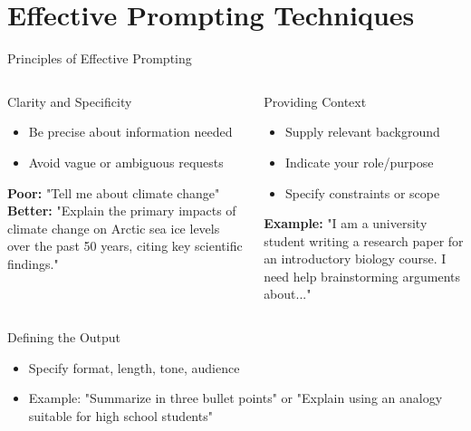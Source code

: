 \documentclass{beamer}
\begin{document}
\section{Effective Prompting Techniques}



\begin{frame}{Principles of Effective Prompting}
\begin{columns}
\begin{block}{Clarity and Specificity}
\begin{itemize}
  \item Be precise about information needed
  \item Avoid vague or ambiguous requests
\end{itemize}
\textbf{Poor:} "Tell me about climate change"
\textbf{Better:} "Explain the primary impacts of climate change on Arctic sea ice levels over the past 50 years, citing key scientific findings."
\end{block}

\pause

\begin{block}{Providing Context}
\begin{itemize}
  \item Supply relevant background
  \item Indicate your role/purpose
  \item Specify constraints or scope
\end{itemize}
\vspace{0.2cm}
\textbf{Example:} "I am a university student writing a research paper for an introductory biology course. I need help brainstorming arguments about..."
\end{block}
\end{columns}

\pause

\begin{block}{Defining the Output}
\begin{itemize}
  \item Specify format, length, tone, audience
  \item Example: "Summarize in three bullet points" or "Explain using an analogy suitable for high school students"
\end{itemize}
\end{block}
\end{frame}
\end{document}
